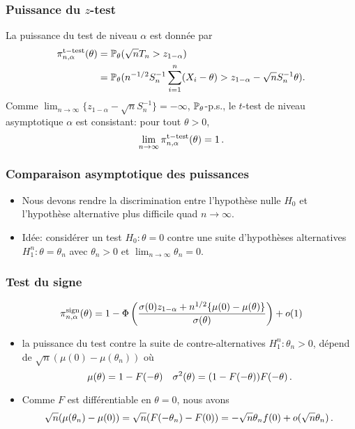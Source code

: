 \begin{frame}
\frametitle{Puissance du $z$-test}
La puissance du test de niveau $\alpha$ est donnée par
\begin{align*}
\pi^{\mathrm{t-test}}_{n,\alpha}(\theta)
&= \operatorname{{\mathbb P}}_{\theta}(\sqrt{n} T_n > z_{1-\alpha})\\
&=  \operatorname{{\mathbb P}}_{\theta}(n^{-1/2} S_n^{-1} \sum_{i=1}^n (X_i - \theta) > z_{1-\alpha} - \sqrt{n} S_n^{-1} \theta).
\end{align*}
Comme $\lim_{n \to \infty} \{ z_{1-\alpha} - \sqrt{n} S_n^{-1} \} = - \infty$, $\operatorname{{\mathbb P}}_\theta$-p.s.,
le $t$-test de niveau asymptotique $\alpha$ est \alert{consistant}: pour tout $\theta > 0$,
\alert{
\[
\lim_{n \to \infty} \pi^{\mathrm{t-test}}_{n,\alpha}(\theta) = 1 \,.
\]
}

\end{frame}

\begin{frame}
\frametitle{Comparaison asymptotique des puissances}
\begin{itemize}
\item Nous devons rendre la discrimination entre l'hypothèse nulle $H_0$ et l'hypothèse alternative plus \alert{difficile} quad $n \to \infty$.
\item \alert{Idée: }  considérer un test $H_0: \theta = 0$ contre \alert{une suite d'hypothèses alternatives} $H^n_1: \theta = \theta_n$ avec $\theta_n > 0$ et $\lim_{n \to \infty} \theta_n = 0$.
\end{itemize}
\end{frame}

\begin{frame}
\frametitle{Test du signe}
$$
\pi^{\mathrm{sign}}_{n,\alpha}(\theta)=
1 - \Phi\left( \frac{\sigma(0) z_{1-\alpha} + n^{1/2} \{ \mu(0) - \mu(\theta)\}}{\sigma(\theta)} \right) + o(1)
$$
\begin{itemize}
\item  la puissance du test contre la suite de contre-alternatives $H_1^n: \theta_n > 0$, dépend de $\sqrt{n} (\mu(0) - \mu(\theta_n))$ où
\[
\mu(\theta) = 1 - F(-\theta) \quad \sigma^2(\theta) = (1-F(-\theta)) F(-\theta) \,.
\]
\item Comme $F$ est différentiable en $\theta = 0$, nous avons
\[
\sqrt{n}(\mu(\theta_n) - \mu(0))= \sqrt{n} ( F(-\theta_n) - F(0)) = - \sqrt{n} \theta_n f(0) + o(\sqrt{n} \theta_n) \,.
\]
\end{itemize}
\end{frame}

